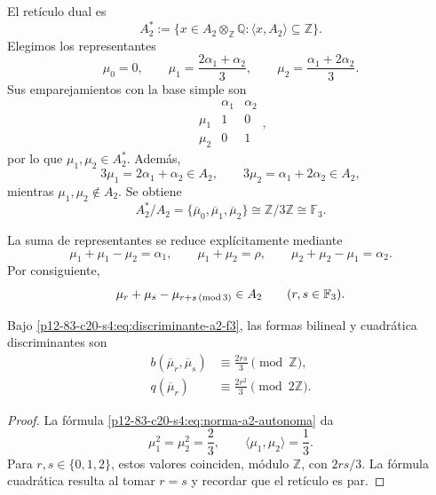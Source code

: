 El retículo dual es
\[
 A_2^*
 :=\{x\in A_2\otimes_{\mathbb Z}\mathbb Q:
       \langle x,A_2\rangle\subseteq\mathbb Z\}.
\]
Elegimos los representantes
\begin{equation}
 \mu_0=0,
 \qquad
 \mu_1=\frac{2\alpha_1+\alpha_2}{3},
 \qquad
 \mu_2=\frac{\alpha_1+2\alpha_2}{3}.
 \label{p12-83-c20-s4:eq:representantes-discriminantes-a2}
\end{equation}
Sus emparejamientos con la base simple son
\[
\begin{array}{c|cc}
 &\alpha_1&\alpha_2\\ \hline
 \mu_1&1&0\\
 \mu_2&0&1
\end{array},
\]
por lo que \(\mu_1,\mu_2\in A_2^*\). Además,
\[
 3\mu_1=2\alpha_1+\alpha_2\in A_2,
 \qquad
 3\mu_2=\alpha_1+2\alpha_2\in A_2,
\]
mientras \(\mu_1,\mu_2\notin A_2\). Se obtiene
\begin{equation}
 A_2^*/A_2
 =\{\overline\mu_0,\overline\mu_1,\overline\mu_2\}
 \cong\mathbb Z/3\mathbb Z
 \cong\mathbb F_3.
 \label{p12-83-c20-s4:eq:discriminante-a2-f3}
\end{equation}

La suma de representantes se reduce explícitamente mediante
\[
 \mu_1+\mu_1-\mu_2=\alpha_1,
 \qquad
 \mu_1+\mu_2=\rho,
 \qquad
 \mu_2+\mu_2-\mu_1=\alpha_2.
\]
Por consiguiente,
\begin{equation}
 \mu_r+\mu_s-\mu_{r+s\,({\rm mod}\,3)}\in A_2
 \qquad(r,s\in\mathbb F_3).
 \label{p12-83-c20-s4:eq:adicion-representantes-discriminantes-a2}
\end{equation}

\begin{proposition}
\label{p12-83-c20-s4:prop:forma-discriminante-a2}
Bajo \eqref{p12-83-c20-s4:eq:discriminante-a2-f3}, las formas bilineal y cuadrática
discriminantes son
\begin{align}
 b(\overline\mu_r,\overline\mu_s)
 &\equiv\frac{2rs}{3}\pmod{\mathbb Z},
 \label{p12-83-c20-s4:eq:bilineal-discriminante-a2}\\
 q(\overline\mu_r)
 &\equiv\frac{2r^2}{3}\pmod{2\mathbb Z}.
 \label{p12-83-c20-s4:eq:cuadratica-discriminante-a2}
\end{align}
\end{proposition}

\begin{proof}
La fórmula \eqref{p12-83-c20-s4:eq:norma-a2-autonoma} da
\[
 \mu_1^2=\mu_2^2=\frac23,
 \qquad
 \langle\mu_1,\mu_2\rangle=\frac13.
\]
Para \(r,s\in\{0,1,2\}\), estos valores coinciden, módulo
\(\mathbb Z\), con \(2rs/3\). La fórmula cuadrática resulta al tomar
\(r=s\) y recordar que el retículo es par.
\end{proof}

